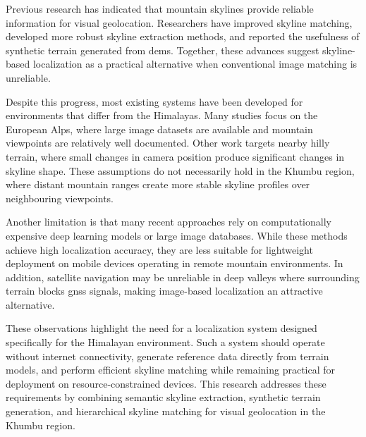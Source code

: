 Previous research has indicated that mountain skylines provide reliable information for visual geolocation. Researchers have improved skyline matching, developed more robust skyline extraction methods, and reported the usefulness of synthetic terrain generated from \Glspl{dem}. Together, these advances suggest skyline-based localization as a practical alternative when conventional image matching is unreliable.

Despite this progress, most existing systems have been developed for environments that differ from the Himalayas. Many studies focus on the European Alps, where large image datasets are available and mountain viewpoints are relatively well documented. Other work targets nearby hilly terrain, where small changes in camera position produce significant changes in skyline shape. These assumptions do not necessarily hold in the Khumbu region, where distant mountain ranges create more stable skyline profiles over neighbouring viewpoints.

Another limitation is that many recent approaches rely on computationally expensive deep learning models or large image databases. While these methods achieve high localization accuracy, they are less suitable for lightweight deployment on mobile devices operating in remote mountain environments. In addition, satellite navigation may be unreliable in deep valleys where surrounding terrain blocks \Gls{gnss} signals, making image-based localization an attractive alternative.

These observations highlight the need for a localization system designed specifically for the Himalayan environment. Such a system should operate without internet connectivity, generate reference data directly from terrain models, and perform efficient skyline matching while remaining practical for deployment on resource-constrained devices. This research addresses these requirements by combining semantic skyline extraction, synthetic terrain generation, and hierarchical skyline matching for visual geolocation in the Khumbu region.
